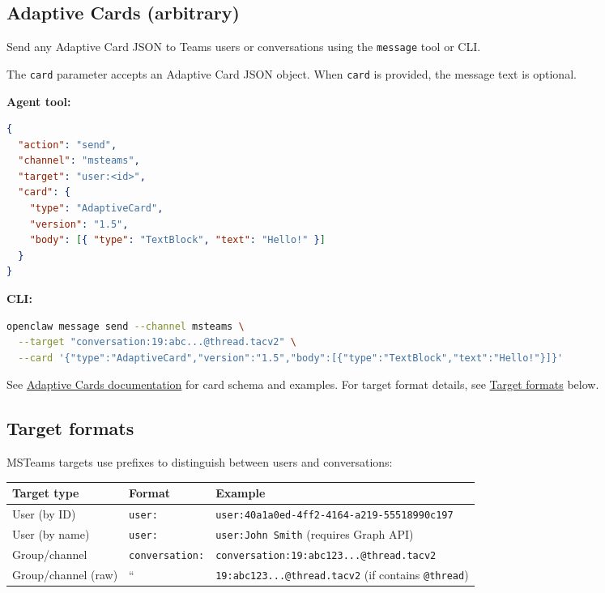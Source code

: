 \subsection{Adaptive Cards (arbitrary)}


Send any Adaptive Card JSON to Teams users or conversations using the \texttt{message} tool or CLI.

The \texttt{card} parameter accepts an Adaptive Card JSON object. When \texttt{card} is provided, the message text is optional.

\textbf{Agent tool:}

\begin{lstlisting}[language=json]
{
  "action": "send",
  "channel": "msteams",
  "target": "user:<id>",
  "card": {
    "type": "AdaptiveCard",
    "version": "1.5",
    "body": [{ "type": "TextBlock", "text": "Hello!" }]
  }
}
\end{lstlisting}


\textbf{CLI:}

\begin{lstlisting}[language=bash]
openclaw message send --channel msteams \
  --target "conversation:19:abc...@thread.tacv2" \
  --card '{"type":"AdaptiveCard","version":"1.5","body":[{"type":"TextBlock","text":"Hello!"}]}'
\end{lstlisting}


See \href{https://adaptivecards.io/}{Adaptive Cards documentation} for card schema and examples. For target format details, see \href{\#target-formats}{Target formats} below.

\subsection{Target formats}


MSTeams targets use prefixes to distinguish between users and conversations:


\begin{table}[h]
\centering
\small
\begin{tabular}{|l|l|l|}
\hline
Target type & Format & Example \\
\hline
User (by ID) & \texttt{user:} & \texttt{user:40a1a0ed-4ff2-4164-a219-55518990c197} \\
\hline
User (by name) & \texttt{user:} & \texttt{user:John Smith} (requires Graph API) \\
\hline
Group/channel & \texttt{conversation:} & \texttt{conversation:19:abc123...@thread.tacv2} \\
\hline
Group/channel (raw) & `` & \texttt{19:abc123...@thread.tacv2} (if contains \texttt{@thread}) \\
\hline
\end{tabular}
\end{table}



